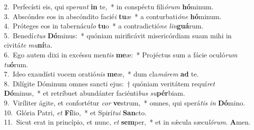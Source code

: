 {2.~}Perfecísti eis, qui spe\textit{rant} \textbf{in} te,~* in conspéctu fili\textit{ó}\textit{rum} \textbf{hó}minum.\\
{3.~}Abscóndes eos in abscóndito facié\textit{i} \textbf{tu}æ~* a conturbati\textit{ó}\textit{ne} \textbf{hó}minum.\\
{4.~}Próteges eos in tabernácu\textit{lo} \textbf{tu}o~* a contradictió\textit{ne} \textit{lin}\textbf{guá}rum.\\
{5.~}Benedí\textit{ctus} \textbf{Dó}minus:~* quóniam mirificávit misericórdiam suam mihi in civitá\textit{te} \textit{mu}\textbf{ní}ta.\\
{6.~}Ego autem dixi in excéssu men\textit{tis} \textbf{me}æ:~* Projéctus sum a fácie oculó\textit{rum} \textit{tu}\textbf{ó}rum.\\
{7.~}Ideo exaudísti vocem oratió\textit{nis} \textbf{me}æ,~* dum cla\textit{má}\textit{rem} \textbf{ad} te.\\
{8.~}Dilígite Dóminum omnes sancti ejus:~† quóniam veritátem requí\textit{ret} \textbf{Dó}minus,~* et retríbuet abundánter faciénti\textit{bus} \textit{su}\textbf{pér}biam.\\
{9.~}Viríliter ágite, et confortétur \textit{cor} \textbf{ve}strum,~* omnes, qui sperá\textit{tis} \textit{in} \textbf{Dó}mino.\\
{10.~}Glória Patri, \textit{et} \textbf{Fí}lio,~* et Spirí\textit{tu}\textit{i} \textbf{San}cto.\\
{11.~}Sicut erat in princípio, et nunc, \textit{et} \textbf{sem}per,~* et in sǽcula sæcu\textit{ló}\textit{rum}. \textbf{A}men.\\
